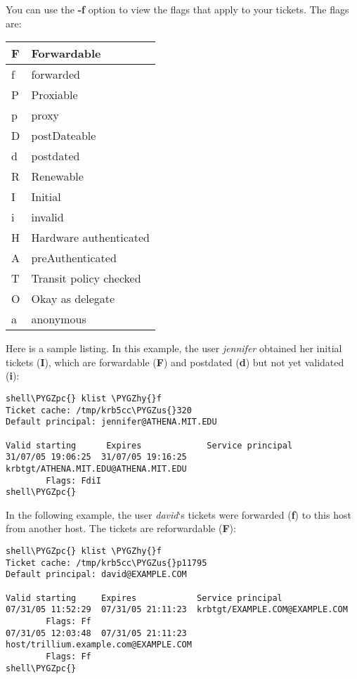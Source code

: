 \documentclass[letterpaper,10pt,english]{sphinxmanual}
\def\PYGZus{\char`\_}
\def\PYGZpc{\char`\%}
\def\PYGZhy{\char`\-}
\begin{document}
You can use the \textbf{-f} option to view the flags that apply to your
tickets.  The flags are:

\begin{tabulary}{\linewidth}{|L|L|}
\hline

F
 & 
Forwardable
\\
\hline
f
 & 
forwarded
\\
\hline
P
 & 
Proxiable
\\
\hline
p
 & 
proxy
\\
\hline
D
 & 
postDateable
\\
\hline
d
 & 
postdated
\\
\hline
R
 & 
Renewable
\\
\hline
I
 & 
Initial
\\
\hline
i
 & 
invalid
\\
\hline
H
 & 
Hardware authenticated
\\
\hline
A
 & 
preAuthenticated
\\
\hline
T
 & 
Transit policy checked
\\
\hline
O
 & 
Okay as delegate
\\
\hline
a
 & 
anonymous
\\
\hline\end{tabulary}


Here is a sample listing.  In this example, the user \emph{jennifer}
obtained her initial tickets (\textbf{I}), which are forwardable (\textbf{F})
and postdated (\textbf{d}) but not yet validated (\textbf{i}):

\begin{Verbatim}[commandchars=\\\{\}]
shell\PYGZpc{} klist \PYGZhy{}f
Ticket cache: /tmp/krb5cc\PYGZus{}320
Default principal: jennifer@ATHENA.MIT.EDU

Valid starting      Expires             Service principal
31/07/05 19:06:25  31/07/05 19:16:25  krbtgt/ATHENA.MIT.EDU@ATHENA.MIT.EDU
        Flags: FdiI
shell\PYGZpc{}
\end{Verbatim}

In the following example, the user \emph{david}`s tickets were forwarded
(\textbf{f}) to this host from another host.  The tickets are reforwardable
(\textbf{F}):

\begin{Verbatim}[commandchars=\\\{\}]
shell\PYGZpc{} klist \PYGZhy{}f
Ticket cache: /tmp/krb5cc\PYGZus{}p11795
Default principal: david@EXAMPLE.COM

Valid starting     Expires            Service principal
07/31/05 11:52:29  07/31/05 21:11:23  krbtgt/EXAMPLE.COM@EXAMPLE.COM
        Flags: Ff
07/31/05 12:03:48  07/31/05 21:11:23  host/trillium.example.com@EXAMPLE.COM
        Flags: Ff
shell\PYGZpc{}
\end{Verbatim}
\end{document}
